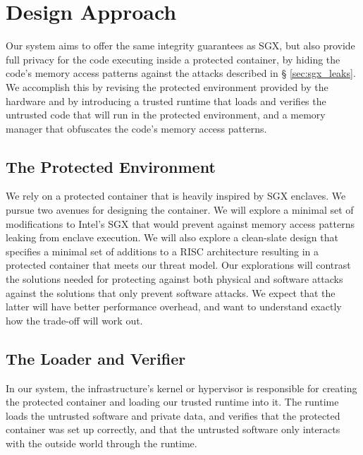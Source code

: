 \section{Design Approach}
\label{sec:design}

Our system aims to offer the same integrity guarantees as SGX, but also provide
full privacy for the code executing inside a protected container, by hiding the
code's memory access patterns against the attacks described in \S
\ref{sec:sgx_leaks}. We accomplish this by revising the protected environment
provided by the hardware and by introducing a trusted runtime that loads and
verifies the untrusted code that will run in the protected environment, and a
memory manager that obfuscates the code's memory access patterns.


\subsection{The Protected Environment}
\label{sec:protected_environment}

We rely on a protected container that is heavily inspired by SGX enclaves. We
pursue two avenues for designing the container. We will explore a minimal set
of modifications to Intel's SGX that would prevent against memory access
patterns leaking from enclave execution. We will also explore a clean-slate
design that specifies a minimal set of additions to a RISC architecture
resulting in a protected container that meets our threat model. Our
explorations will contrast the solutions needed for protecting against both
physical and software attacks against the solutions that only prevent software
attacks. We expect that the latter will have better performance overhead, and
want to understand exactly how the trade-off will work out.


\subsection{The Loader and Verifier}
\label{sec:loader_verifier}

In our system, the infrastructure's kernel or hypervisor is responsible for
creating the protected container and loading our trusted runtime into it. The
runtime loads the untrusted software and private data, and verifies that the
protected container was set up correctly, and that the untrusted software
only interacts with the outside world through the runtime.

